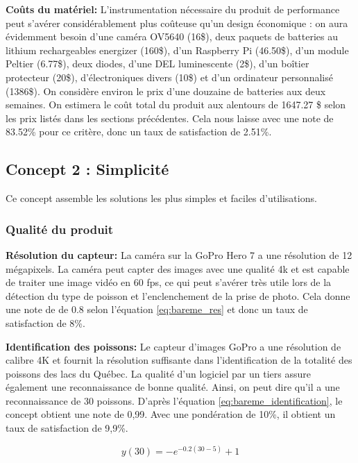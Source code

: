 \textbf{Coûts du matériel:}
L’instrumentation nécessaire du produit de performance peut s’avérer considérablement plus coûteuse qu'un design économique : on aura évidemment besoin d’une caméra OV5640 (16\$), deux paquets de batteries au lithium rechargeables energizer (160\$), d'un Raspberry Pi (46.50\$), d'un module Peltier (6.77\$), deux diodes, d'une DEL luminescente (2\$), d'un boîtier protecteur (20\$), d'électroniques divers (10\$) et d'un ordinateur personnalisé (1386\$). On considère environ le prix d'une douzaine de batteries aux deux semaines. On estimera le coût total du produit aux alentours de 1647.27 \$ selon les prix listés dans les sections précédentes. Cela nous laisse avec une note de 83.52\% pour ce critère, donc un taux de satisfaction de 2.51\%. 




\subsection{Concept 2 : Simplicité}
Ce concept assemble les solutions les plus simples et faciles d'utilisations.

\subsubsection{Qualité du produit}


\textbf{Résolution du capteur:} La caméra sur la GoPro Hero 7 a une résolution de 12 mégapixels. La caméra peut capter des images avec une qualité 4k et est capable de traiter une image vidéo en 60 fps, ce qui peut s’avérer très utile lors de la détection du type de poisson et l’enclenchement de la prise de photo. Cela donne une note de de 0.8 selon l'équation \ref{eq:bareme_res} et donc un taux de satisfaction de 8\%.
\vspace{5mm}



\textbf{Identification des poissons:}
Le capteur d'images GoPro a une résolution de calibre 4K et fournit la résolution suffisante dans l'identification de la totalité des poissons des lacs du Québec. La qualité d'un logiciel par un tiers assure également une reconnaissance de bonne qualité. Ainsi, on peut dire qu'il a une reconnaissance de 30 poissons. D'après l'équation \ref{eq:bareme_identification}, le concept obtient une note de 0,99. Avec une pondération de 10\%, il obtient un taux de satisfaction de 9,9\%.

\begin{equation}
    y(30) = -e^{-0.2(30-5)} + 1  \end{equation}
\vspace{5mm}


